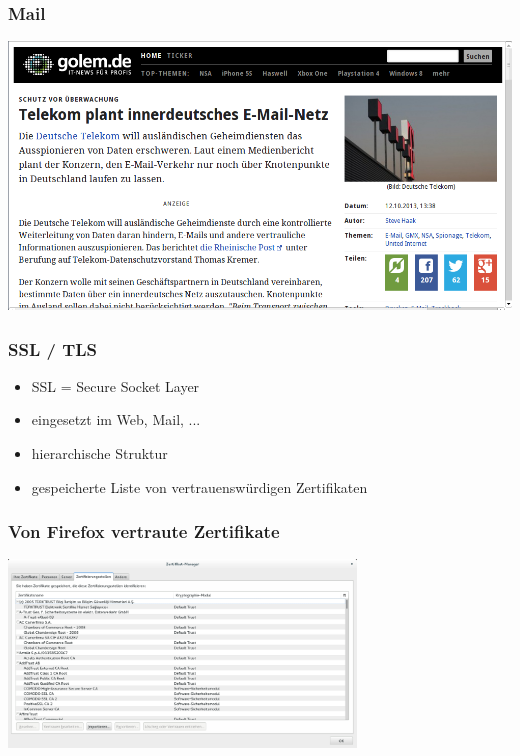 \documentclass[12pt]{beamer}
\newcommand{\cc}[1]{\texttt{[image: img/\#1.png]}}
\begin{document}
\begin{frame}
    \frametitle{Mail}
    \includegraphics[height=0.7\textheight]{img/telekom_mail.png}
\end{frame}



\begin{frame}
    \frametitle{SSL / TLS}
    \begin{itemize}
      \item<2-> SSL = Secure Socket Layer
      \item<3-> eingesetzt im Web, Mail, ...
      \item<4-> hierarchische Struktur
      \item<5-> gespeicherte Liste von vertrauenswürdigen Zertifikaten
    \end{itemize}
\end{frame}

\begin{frame}
    \frametitle{Von Firefox vertraute Zertifikate}
    \begin{center}
      \includegraphics[height=5cm]{img/zertifikate.png}
    \end{center}
\end{frame}
\end{document}
